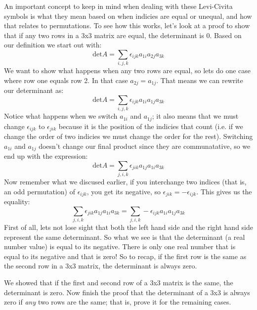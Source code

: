 An important concept to keep in mind when dealing with these Levi-Civita symbols is what they mean based on when indicies are equal or unequal, and how that relates to permutations.  To see how this works, let's look at a proof to show that if any two rows in a 3x3 matrix are equal, the determinant is 0.  Based on our definition we start out with:
\[
\text{det} A = \sum_{i,j,k} \epsilon_{ijk} a_{1i} a_{2j} a_{3k}
\]
We want to show what happens when any two rows are equal, so lets do one case where row one equals row 2.  In that case $a_{2j}=a_{1j}$.  That means we can rewrite our determinant as:
\[
\text{det} A =  \sum_{i,j,k} \epsilon_{ijk} a_{1i} a_{1j} a_{3k}
\]
Notice what happens when we switch $a_{1i}$ and $a_{1j}$; it also means that we must change $\epsilon_{ijk}$ to $\epsilon_{jik}$ because it is the position of the indicies that count (i.e. if we change the order of two indicies we must change the order for the rest).  Switching $a_{1i}$ and $a_{1j}$ doesn't change our final product since they are communatative, so we end up with the expression:
\[
\text{det} A =   \sum_{j,i,k} \epsilon_{jik} a_{1j} a_{1i} a_{3k} 
\]
Now remember what we discused earlier, if you interchange two indices (that is, an odd permutation) of $\epsilon_{ijk}$, you get its negative, so $\epsilon_{jik}=-\epsilon_{ijk}$.  This gives us the equality:
\[
\sum_{j,i,k} \epsilon_{jik} a_{1j} a_{1i} a_{3k}=\sum_{j,i,k} - \epsilon_{ijk} a_{1i} a_{1j} a_{3k}
\]
First of all, lets not lose sight that both the left hand side and the right hand side represent the same determinant.  So what we see is that the determinant (a real number value) is equal to its negative.  There is only one real number that is equal to its negative and that is zero!  So to recap, if the first row is the same as the second row in a 3x3 matrix, the determinant is always zero.

\begin{exercise}
We showed that if the first and second row of a 3x3 matrix is the same, the determinant is zero.  Now finish the proof that the determinant of a 3x3 is always zero if \emph{any} two rows are the same; that is, prove it for the remaining cases.
\end{exercise}{} 

